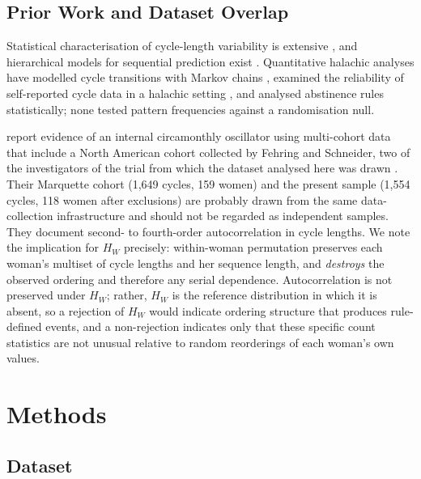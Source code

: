 \documentclass[12pt]{article}
\newcommand{\HW}{H_{W}}
\begin{document}
\subsection{Prior Work and Dataset Overlap}
\label{sec:prior}

Statistical characterisation of cycle-length variability is extensive
\citep{munster1992,creinin2004,harlow2000,fehring2006,dasharathy2012,symul2019,bull2019},
and hierarchical models for sequential prediction exist \citep{bortot2010}. Quantitative
halachic analyses have modelled cycle transitions with Markov chains
\citep{ross2022markov}, examined the reliability of self-reported cycle data in a
halachic setting \citep{ross2019reliability}, and analysed abstinence rules
statistically; none tested pattern frequencies against a randomisation null.

\citet{ecochard2024} report evidence of an internal circamonthly oscillator using
multi-cohort data that include a North American cohort collected by Fehring and
Schneider, two of the investigators of the trial from which the dataset analysed here
was drawn \citep{fehring2012data,fehring2013}.
Their Marquette cohort (1,649 cycles, 159 women) and the present sample (1,554 cycles,
118 women after exclusions) are probably drawn from the same data-collection
infrastructure and should not be regarded as independent samples. They document second-
to fourth-order autocorrelation in cycle lengths. We note the implication for $\HW$
precisely: within-woman permutation preserves each woman's multiset of cycle lengths
and her sequence length, and \emph{destroys} the observed ordering and therefore any
serial dependence. Autocorrelation is not preserved under $\HW$; rather, $\HW$ is the
reference distribution in which it is absent, so a rejection of $\HW$ would indicate
ordering structure that produces rule-defined events, and a non-rejection indicates only
that these specific count statistics are not unusual relative to random reorderings of
each woman's own values.

\section{Methods}
\label{sec:methods}

\subsection{Dataset}
\label{sec:data}
\end{document}
